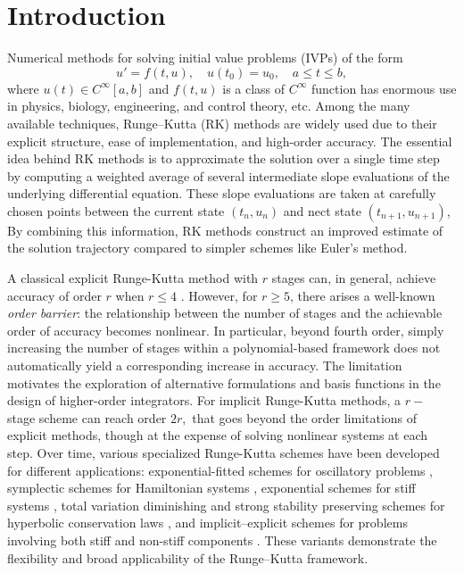 \documentclass[a4paper, preprint,11pt]{elsarticle}
\numberwithin{equation}{section}
\begin{document}
\section{Introduction}
Numerical methods for solving initial value problems (IVPs) of the form
\begin{equation}\label{eq:ivp}
u' = f(t, u), \quad u(t_0) = u_0, \quad a \leq t\leq b,
\end{equation} where $u(t) \in C^{\infty}[a,b]$ and $f(t,u)$ is a class of $C^{\infty}$ function has enormous use in physics, biology, engineering, and control theory, etc.  Among the many available techniques, Runge–Kutta (RK) methods are widely used due to their explicit structure, ease of implementation, and high-order accuracy.
The essential idea behind RK methods is to approximate the solution over a single time step by computing a weighted average of several intermediate slope evaluations of the underlying differential equation. These slope evaluations are taken at carefully chosen points between the current state 
$(t_n, u_n)$ and nect state $(t_{n+1}, u_{n+1})$, By combining this information, RK methods construct an improved estimate of the solution trajectory compared to simpler schemes like Euler’s method. 

\par A classical explicit Runge-Kutta method with $r$ stages can, in general, achieve accuracy of order $r$ when $r \leq 4$ \cite{book1}. However, for $r \geq 5$, there arises a well-known \emph{order barrier}: the relationship between the number of stages and the achievable order of accuracy becomes nonlinear. In particular, beyond fourth order, simply increasing the number of stages within a polynomial-based framework does not automatically yield a corresponding increase in accuracy. The limitation motivates the exploration of alternative formulations and basis functions in the design of higher-order integrators. For implicit Runge-Kutta methods, a $r-$ stage scheme can reach order $2r,$ that goes beyond the order limitations of explicit methods, though at the expense of solving nonlinear systems at each step. Over time, various specialized Runge-Kutta schemes have been developed for different applications: exponential-fitted schemes for oscillatory problems \cite{vanden1999exponentially,simos2001fourth,franco2004exponentially}, symplectic schemes for Hamiltonian systems \cite{sanz1992symplectic,hairer2006structure,mei2017symplectic}, exponential schemes for stiff systems \cite{hochbruck2005explicit,hochbruck2005exponential,hochbruck2010exponential}, total variation diminishing and strong stability preserving schemes for hyperbolic conservation laws \cite{shu1988efficient,gottlieb1998total,gottlieb2001strong,bresten2017explicit}, and implicit–explicit schemes for problems involving both stiff and non-stiff components \cite{pareschi2005implicit,boscarino2016high,SB}. These variants demonstrate the flexibility and broad applicability of the Runge–Kutta framework.
\end{document}
